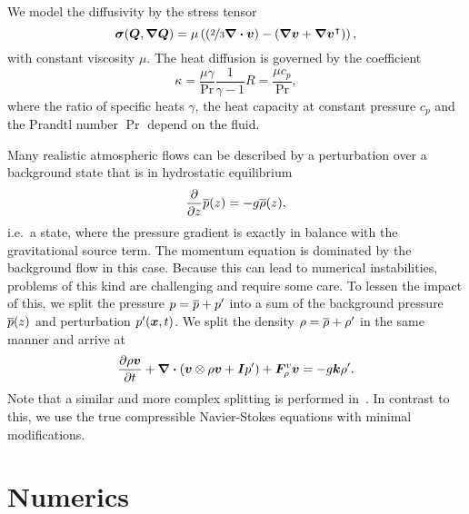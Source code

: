 \documentclass[runningheads]{llncs}
\begin{document}
We model the diffusivity by the stress tensor
\begin{equation}
  \label{eq:stress-tensor}
  \stressT(\Q, \gradQ) =
  \mu
  \left(
  \left(\nicefrac{2}{3} \divergence{\Qv} \right) -
  \left( \gradient{\Qv} + \gradient{\Qv}^\intercal \right)
  \right),
\end{equation}
with constant viscosity $\mu$.
The heat diffusion is governed by the coefficient
\begin{equation}
  \label{eq:heat-conduction-coeff}
  \kappa = \frac{\mu \gamma}{\Pr} \frac{1}{\gamma - 1} R = \frac{\mu c_p}{\Pr},
\end{equation}
where the ratio of specific heats $\gamma$, the heat capacity at constant pressure $c_p$ and the Prandtl number $\Pr$ depend on the fluid.

Many realistic atmospheric flows can be described by a perturbation over a background state that is in hydrostatic equilibrium
\newcommand{\backgroundPressure}{\overline{\pressure}}
\newcommand{\backgroundRho}{\overline{\Qrho}}
\begin{equation}
  \label{eq:hydrostatic-balance}
  \pdv{}{z} \backgroundPressure{\left (z \right )} = -g \backgroundRho(z),
\end{equation}
i.e.\ a state, where the pressure gradient is exactly in balance with the gravitational source term.
The momentum equation is dominated by the background flow in this case.
Because this can lead to numerical instabilities, problems of this kind are challenging and require some care.
To lessen the impact of this, we split the pressure $\pressure = \backgroundPressure + \pressure'$ into a sum of the background pressure $\backgroundPressure(z)$ and perturbation $p'(\bm{x}, t)$.
We split the density $\Qrho = \backgroundRho + \Qrho'$ in the same manner and arrive at
\begin{equation}
  \label{eq:momentum-equation-split}
  \pdv{\Qj}{t}+ \divergence{ \left(
    \Qv \otimes \Qj + \bm{I} \pressure'
    \right)
  } + \viscFlux_\Qj
  =
  -g \bm{k} \Qrho'.
\end{equation}
Note that a similar and more complex splitting is performed in~\cite{muller2010adaptive,giraldo2008study}.
In contrast to this, we use the true compressible Navier-Stokes equations with minimal modifications.
\section{Numerics}
\end{document}
